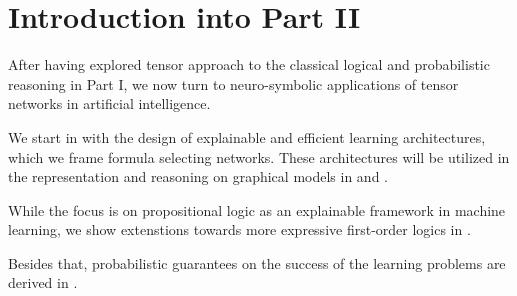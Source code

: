 \chapter{Introduction into Part II}

After having explored tensor approach to the classical logical and probabilistic reasoning in Part I, we now turn to neuro-symbolic applications of tensor networks in artificial intelligence.

We start in  with the design of explainable and efficient learning architectures, which we frame formula selecting networks.
These architectures will be utilized in the representation and reasoning on graphical models in  and .

While the focus is on propositional logic as an explainable framework in machine learning, we show extenstions towards more expressive first-order logics in .

Besides that, probabilistic guarantees on the success of the learning problems are derived in .